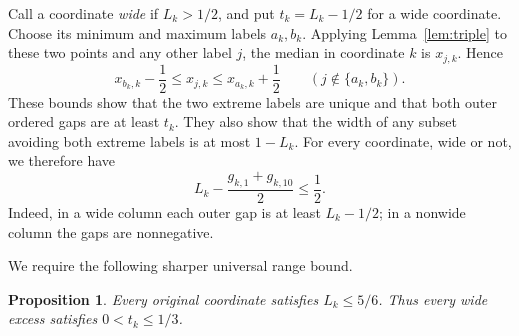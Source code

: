 \documentclass[11pt]{article}
\newtheorem{proposition}[theorem]{Proposition}
\theoremstyle{definition}
\theoremstyle{remark}
\begin{document}
Call a coordinate \emph{wide} if $L_k>1/2$, and put
$t_k=L_k-1/2$ for a wide coordinate. Choose its minimum and maximum
labels $a_k,b_k$. Applying Lemma~\ref{lem:triple} to these two points and
any other label $j$, the median in coordinate $k$ is $x_{j,k}$. Hence
\begin{equation}\label{eq:inner}
 x_{b_k,k}-\frac12\leq x_{j,k}\leq x_{a_k,k}+\frac12
       \qquad(j\notin\{a_k,b_k\}).
\end{equation}
These bounds show that the two extreme labels are unique and that both
outer ordered gaps are at least $t_k$. They also show that the width of
any subset avoiding both extreme labels is at most $1-L_k$.
For every coordinate, wide or not, we therefore have
\begin{equation}\label{eq:outerrange}
 L_k-\frac{g_{k,1}+g_{k,10}}2\leq\frac12.
\end{equation}
Indeed, in a wide column each outer gap is at least $L_k-1/2$;
in a nonwide column the gaps are nonnegative.

We require the following sharper universal range bound.

\begin{proposition}\label{prop:range}
Every original coordinate satisfies $L_k\leq5/6$. Thus every wide excess
satisfies $0<t_k\leq1/3$.
\end{proposition}
\end{document}
